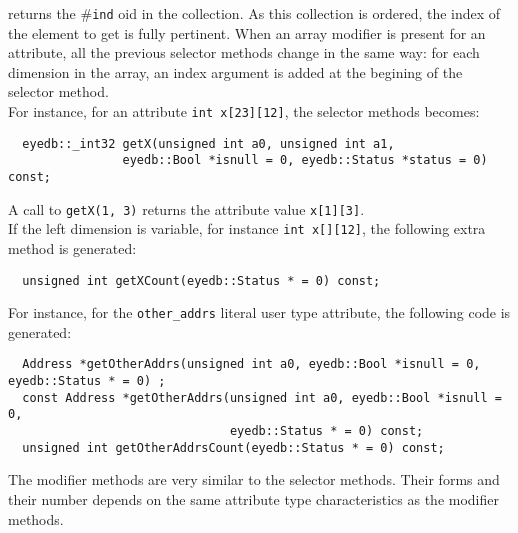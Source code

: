 \normalsize
returns the \#\texttt{ind} oid in the collection.
As this collection is ordered, the index of the element to get is fully
pertinent.
\ee
{}
When an array modifier is present for an attribute, all the previous
selector methods change in the same way: for each dimension in the
array, an index argument is added at the begining of the selector method.
\\
For instance, for an attribute \texttt{int x[23][12]}, the selector methods
becomes:
\verbsize
\begin{verbatim}
  eyedb::_int32 getX(unsigned int a0, unsigned int a1,
                eyedb::Bool *isnull = 0, eyedb::Status *status = 0) const;
\end{verbatim}
\normalsize
A call to \texttt{getX(1, 3)} returns the attribute value \texttt{x[1][3]}.
\\
If the left dimension is variable, for instance \texttt{int x[][12]},
the following extra method is generated:
\verbsize
\begin{verbatim}
  unsigned int getXCount(eyedb::Status * = 0) const;
\end{verbatim}
\normalsize
For instance,
for the \texttt{other\_addrs} literal user type attribute, the following
code is generated:
\verbsize
\begin{verbatim}
  Address *getOtherAddrs(unsigned int a0, eyedb::Bool *isnull = 0, eyedb::Status * = 0) ;
  const Address *getOtherAddrs(unsigned int a0, eyedb::Bool *isnull = 0,
                               eyedb::Status * = 0) const;
  unsigned int getOtherAddrsCount(eyedb::Status * = 0) const;
\end{verbatim}
\normalsize
%
The modifier methods are very similar to the selector methods.
Their forms and their number depends on the same attribute type characteristics
as the modifier methods.

